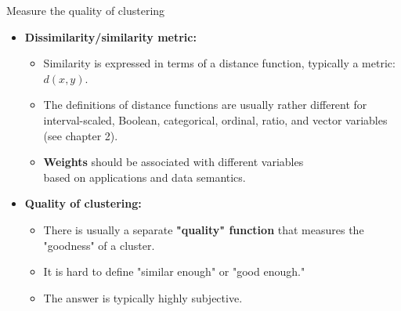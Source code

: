 \documentclass[aspectratio=169,t,xcolor=dvipsnames]{beamer}
\begin{document}
  {
    \begin{frame}{Measure the quality of clustering}
        \begin{itemize}
          \item \textbf{Dissimilarity/similarity metric:}
          \begin{itemize}
            \item Similarity is expressed in terms of a distance function, typically a metric: $d(x,y)$.
            \item The definitions of distance functions are usually rather different for interval-scaled, Boolean, categorical, ordinal, ratio, and vector variables (see chapter 2).
            \item \textbf{\color{airforceblue}Weights} should be associated with different variables \\
                  based on applications and data semantics.
          \end{itemize}
          \item \textbf{Quality of clustering:}
          \begin{itemize}
            \item There is usually a separate \textbf{\color{airforceblue}"quality" function} that measures the "goodness" of a cluster.
            \item It is hard to define "similar enough" or "good enough."
            \item The answer is typically highly subjective.
          \end{itemize}
        \end{itemize}
    \end{frame}
  }
\end{document}
